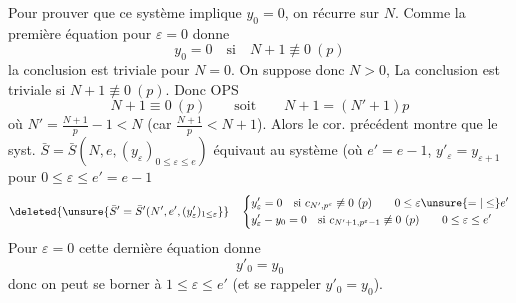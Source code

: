 Pour prouver que ce système implique $y_0=0$, on récurre sur $N$. Comme la première équation pour $\varepsilon=0$ donne
\[
y_0=0\quad\text{si}\quad N+1\not\equiv0\ (p)
\]
la conclusion est triviale pour $N=0$.  On suppose donc $N>0$,  La conclusion est triviale si $N+1\not\equiv0\ (p)$. Donc OPS
\[
N+1\equiv0\ (p)\qquad\text{soit}\qquad N+1=(N'+1)p
\]
où $N'=\frac{N+1}{p}-1<N$ (car $\frac{N+1}{p}<N+1$). Alors le cor. précédent montre que le syst. $\bar S=\bar S(N,e,(y_\varepsilon)_{0\leq\varepsilon\leq e})$  équivaut au système (où $e'=e-1$, $y'_\varepsilon=y_{\varepsilon+1}$ pour $0\leq\varepsilon\leq e'=e-1$
\[
\deleted{\unsure{\bar S'=\bar S'(N',e',(y'_\varepsilon)_{1\leq\varepsilon}}}\quad
\left\{\begin{aligned}
&y'_\varepsilon=0\quad\text{si }c_{N',p^\varepsilon}\not\equiv0\ (p)\qquad 0\leq\varepsilon\unsure{=|\leq}e'\\
&y'_\varepsilon-y_0=0\quad\text{si }c_{N'+1,p^\varepsilon-1}\not\equiv0\ (p)\qquad 0\leq\varepsilon\leq e'
\end{aligned}\right.
\]
Pour $\varepsilon=0$ cette dernière équation donne 
\[
y'_0=y_0
\]
donc on peut se borner à $1\leq\varepsilon\leq e'$ (et se rappeler $y'_0=y_0$).

